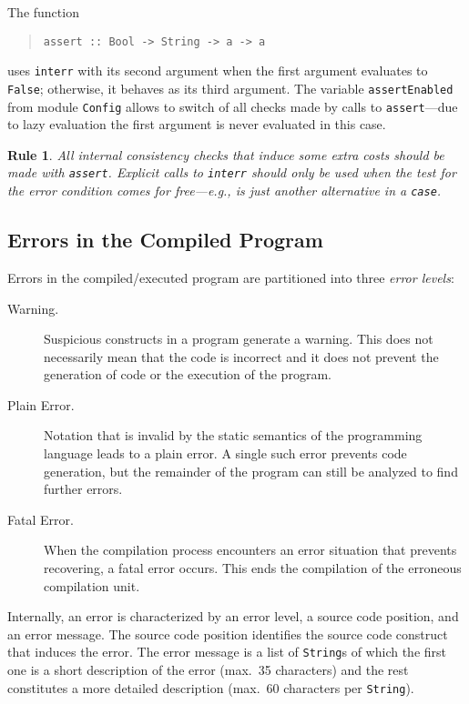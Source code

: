 \documentclass{report}
\newtheorem{designrule}{Rule}
\newcommand{\code}[1]{\texttt{#1}}
\begin{document}
The function
%
\begin{quote}
\begin{verbatim}
assert :: Bool -> String -> a -> a
\end{verbatim}
\end{quote}
%
uses \code{interr} with its second argument when the first argument evaluates
to \code{False}; otherwise, it behaves as its third argument. The variable
\code{assertEnabled} from module \code{Config} allows to switch of all checks
made by calls to \code{assert}---due to lazy evaluation the first argument is
never evaluated in this case.

\begin{designrule}
  All internal consistency checks that induce some extra costs should be made
  with \code{assert}. Explicit calls to \code{interr} should only be used when
  the test for the error condition comes for free---e.g., is just another
  alternative in a \code{case}.
\end{designrule}


\subsection{Errors in the Compiled Program}

Errors in the compiled/executed program are partitioned into three \emph{error
levels}: 
%
\begin{description}
\item[Warning.] Suspicious constructs in a program generate a warning. This
  does not necessarily mean that the code is incorrect and it does not prevent
  the generation of code or the execution of the program.
\item[Plain Error.] Notation that is invalid by the static semantics of the
  programming language leads to a plain error. A single such error prevents 
  code generation, but the remainder of the program can still be analyzed to
  find further errors.
\item[Fatal Error.] When the compilation process encounters an error situation
  that prevents recovering, a fatal error occurs. This ends the compilation of
  the erroneous compilation unit.
\end{description}

Internally, an error is characterized by an error level, a source code
position, and an error message. The source code position identifies the source
code construct that induces the error. The error message is a list of
\code{String}s of which the first one is a short description of the error
(max.\ 35 characters) and the rest constitutes a more detailed description
(max.\ 60 characters per \code{String}).
\end{document}
